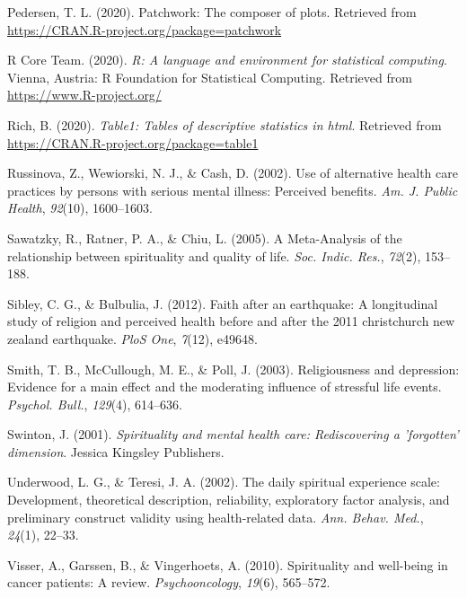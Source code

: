 \documentclass[
  english,
  man,floatsintext]{apa6}
\begin{document}
\leavevmode\hypertarget{ref-R-patchwork}{}%
Pedersen, T. L. (2020). Patchwork: The composer of plots. Retrieved from \url{https://CRAN.R-project.org/package=patchwork}

\leavevmode\hypertarget{ref-R-base}{}%
R Core Team. (2020). \emph{R: A language and environment for statistical computing}. Vienna, Austria: R Foundation for Statistical Computing. Retrieved from \url{https://www.R-project.org/}

\leavevmode\hypertarget{ref-R-table1}{}%
Rich, B. (2020). \emph{Table1: Tables of descriptive statistics in html}. Retrieved from \url{https://CRAN.R-project.org/package=table1}

\leavevmode\hypertarget{ref-Russinova2002-rq}{}%
Russinova, Z., Wewiorski, N. J., \& Cash, D. (2002). Use of alternative health care practices by persons with serious mental illness: Perceived benefits. \emph{Am. J. Public Health}, \emph{92}(10), 1600--1603.

\leavevmode\hypertarget{ref-Sawatzky2005-rw}{}%
Sawatzky, R., Ratner, P. A., \& Chiu, L. (2005). A Meta-Analysis of the relationship between spirituality and quality of life. \emph{Soc. Indic. Res.}, \emph{72}(2), 153--188.

\leavevmode\hypertarget{ref-sibley2012faith}{}%
Sibley, C. G., \& Bulbulia, J. (2012). Faith after an earthquake: A longitudinal study of religion and perceived health before and after the 2011 christchurch new zealand earthquake. \emph{PloS One}, \emph{7}(12), e49648.

\leavevmode\hypertarget{ref-Smith2003-re}{}%
Smith, T. B., McCullough, M. E., \& Poll, J. (2003). Religiousness and depression: Evidence for a main effect and the moderating influence of stressful life events. \emph{Psychol. Bull.}, \emph{129}(4), 614--636.

\leavevmode\hypertarget{ref-Swinton2001-vr}{}%
Swinton, J. (2001). \emph{Spirituality and mental health care: Rediscovering a 'forgotten' dimension}. Jessica Kingsley Publishers.

\leavevmode\hypertarget{ref-Underwood2002-hg}{}%
Underwood, L. G., \& Teresi, J. A. (2002). The daily spiritual experience scale: Development, theoretical description, reliability, exploratory factor analysis, and preliminary construct validity using health-related data. \emph{Ann. Behav. Med.}, \emph{24}(1), 22--33.

\leavevmode\hypertarget{ref-Visser2010-kq}{}%
Visser, A., Garssen, B., \& Vingerhoets, A. (2010). Spirituality and well-being in cancer patients: A review. \emph{Psychooncology}, \emph{19}(6), 565--572.
\end{document}
